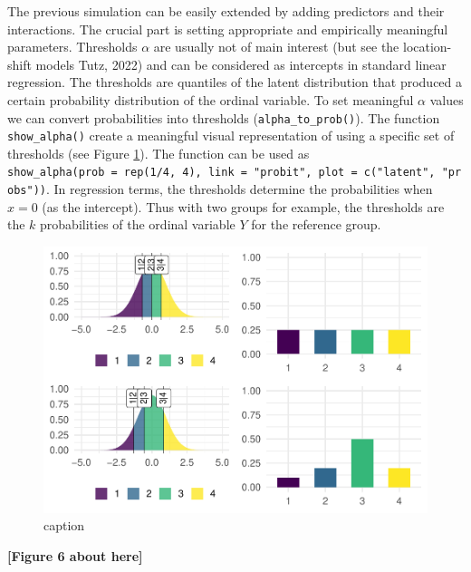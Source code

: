 \documentclass[
  man,floatsintext]{apa6}
\begin{document}
The previous simulation can be easily extended by adding predictors and their interactions. The crucial part is setting appropriate and empirically meaningful parameters. Thresholds \(\alpha\) are usually not of main interest (but see the location-shift models Tutz, 2022) and can be considered as intercepts in standard linear regression. The thresholds are quantiles of the latent distribution that produced a certain probability distribution of the ordinal variable. To set meaningful \(\alpha\) values we can convert probabilities into thresholds (\texttt{alpha\_to\_prob()}). The function \texttt{show\_alpha()} create a meaningful visual representation of using a specific set of thresholds (see Figure \ref{fig:fig-show-th-example}). The function can be used as \texttt{show\_alpha(prob\ =\ rep(1/4,\ 4),\ link\ =\ "probit",\ plot\ =\ c("latent",\ "probs"))}. In regression terms, the thresholds determine the probabilities when \(x = 0\) (as the intercept). Thus with two groups for example, the thresholds are the \(k\) probabilities of the ordinal variable \(Y\) for the reference group.

\scriptsize

\begin{figure}

{\centering \includegraphics{paper-new_files/figure-latex/fig-show-th-example-1} 

}

\caption{caption}\label{fig:fig-show-th-example}
\end{figure}

\begin{center}\textbf{[Figure 6 about here]} \end{center}
\end{document}
